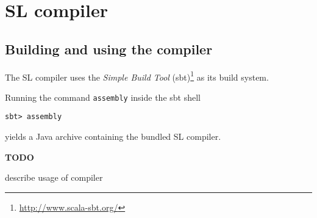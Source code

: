 \documentclass{article}
\newcommand{\TODO}{\begin{center}\LARGE\textbf{TODO}\end{center}}
\begin{document}
\section{SL compiler}
\label{sec:sl-compiler}


\subsection{Building and using the compiler}
\label{sec:build-inst-comp}

The SL compiler uses the \textit{Simple Build Tool}
(sbt)\footnote{\url{http://www.scala-sbt.org/}} as its build system.


\bigskip\noindent
Running the command \verb|assembly| inside the sbt shell
\begin{verbatim}
sbt> assembly 
\end{verbatim}
yields a Java archive containing the bundled SL compiler.

\TODO describe usage of compiler
\end{document}
